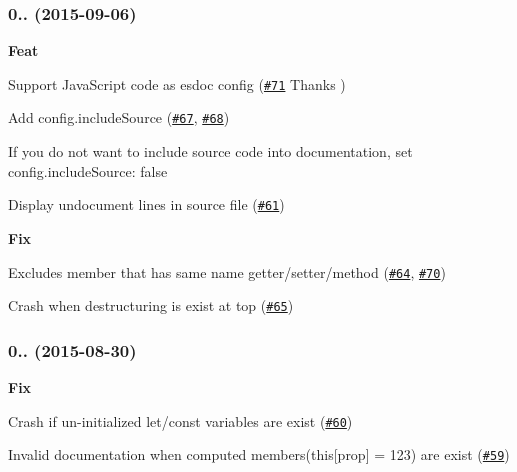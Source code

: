 \subsubsection*{0.. (2015-\/09-\/06)}


\begin{DoxyItemize}
\item {\bfseries Feat}
\begin{DoxyItemize}
\item Support Java\+Script code as esdoc config (\href{https://github.com/esdoc/esdoc/pull/71}{\tt \#71} Thanks )
\item Add {\ttfamily config.\+include\+Source} (\href{https://github.com/esdoc/esdoc/issues/67}{\tt \#67}, \href{https://github.com/esdoc/esdoc/issues/68}{\tt \#68})
\begin{DoxyItemize}
\item If you do not want to include source code into documentation, set {\ttfamily config.\+include\+Source\+: false}
\end{DoxyItemize}
\item Display undocument lines in source file (\href{https://github.com/esdoc/esdoc/issues/61}{\tt \#61})
\end{DoxyItemize}
\item {\bfseries Fix}
\begin{DoxyItemize}
\item Excludes member that has same name getter/setter/method (\href{https://github.com/esdoc/esdoc/issues/64}{\tt \#64}, \href{https://github.com/esdoc/esdoc/issues/70}{\tt \#70})
\item Crash when destructuring is exist at top (\href{https://github.com/esdoc/esdoc/issues/65}{\tt \#65})
\end{DoxyItemize}
\end{DoxyItemize}

\subsubsection*{0.. (2015-\/08-\/30)}


\begin{DoxyItemize}
\item {\bfseries Fix}
\begin{DoxyItemize}
\item Crash if un-\/initialized let/const variables are exist (\href{https://github.com/esdoc/esdoc/issues/60}{\tt \#60})
\item Invalid documentation when computed members({\ttfamily this\mbox{[}prop\mbox{]} = 123}) are exist (\href{https://github.com/esdoc/esdoc/issues/59}{\tt \#59})
\end{DoxyItemize}
\end{DoxyItemize}

